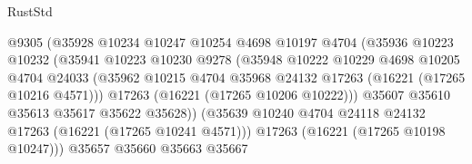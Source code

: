 \begin{lexlean}{RustStd}
\begin{coremodule}
                                      @9305
                                      (@35928
                                        @10234
                                        @10247
                                        @10254
                                        @4698
                                        @10197
                                        @4704
                                        (@35936
                                          @10223
                                          @10232
                                          (@35941
                                            @10223
                                            @10230
                                            @9278
                                            (@35948
                                              @10222
                                              @10229
                                              @4698
                                              @10205
                                              @4704
                                              @24033
                                              (@35962
                                                @10215
                                                @4704
                                                @35968
                                                @24132
                                                @17263
                                                (@16221 (@17265 @10216 @4571)))
                                              @17263
                                              (@16221 (@17265 @10206 @10222)))
                                            @35607
                                            @35610
                                            @35613
                                            @35617
                                            @35622
                                            @35628))
                                        (@35639
                                          @10240
                                          @4704
                                          @24118
                                          @24132
                                          @17263
                                          (@16221 (@17265 @10241 @4571)))
                                        @17263
                                        (@16221 (@17265 @10198 @10247)))
                                      @35657
                                      @35660
                                      @35663
                                      @35667

\end{coremodule}
\end{lexlean}
